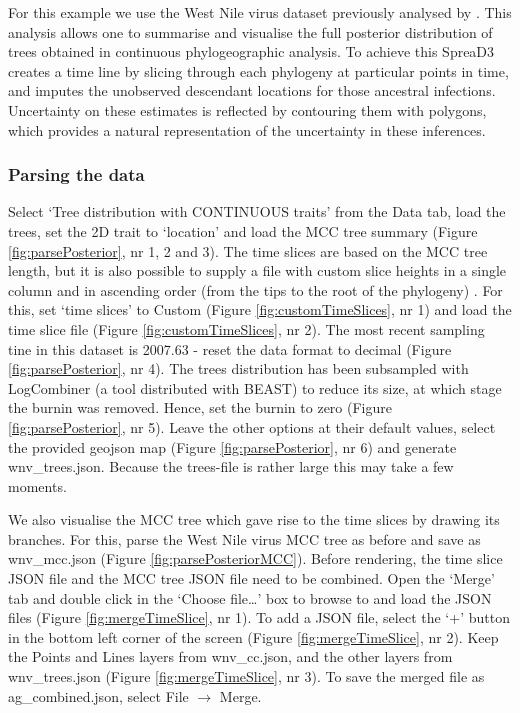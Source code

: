 \documentclass[english]{paper}
\def \spreadname {SpreaD3}
\begin{document}
For this example we use the West Nile virus dataset previously analysed by \citet{Pybus:2012aa}.
This analysis allows one to summarise and visualise the full posterior distribution of trees obtained in continuous phylogeographic analysis. 
To achieve this {\spreadname} creates a time line by slicing through each phylogeny at particular points in time, and imputes the unobserved descendant locations for those ancestral infections.
Uncertainty on these estimates is reflected by contouring them with polygons, which provides a natural representation of the uncertainty in these inferences. 

\subsubsection{Parsing the data}

Select `Tree distribution with CONTINUOUS traits' from the Data tab, load the trees, set the 2D trait to `location' and load the MCC tree summary 
(Figure \ref{fig:parsePosterior}, nr 1, 2 and 3).
The time slices are based on the MCC tree length, but it is also possible to supply a file with custom slice heights in a single column and in ascending order (from the tips to the root of the phylogeny) . 
For this, set `time slices' to Custom (Figure \ref{fig:customTimeSlices}, nr 1) and load the time slice file (Figure \ref{fig:customTimeSlices}, nr 2).
The most recent sampling tine in this dataset is 2007.63 - reset the data format to decimal 
(Figure \ref{fig:parsePosterior}, nr 4).
The trees distribution has been subsampled with LogCombiner (a tool distributed with BEAST) to reduce its size, at which stage the burnin was removed. 
Hence, set the burnin to zero 
(Figure \ref{fig:parsePosterior}, nr 5).
Leave the other options at their default values, select the provided geojson map (Figure \ref{fig:parsePosterior}, nr 6) and generate wnv\_trees.json.
Because the trees-file is rather large this may take a few moments.
\par
We also visualise the MCC tree which gave rise to the time slices by drawing its branches.
For this, parse the West Nile virus MCC tree as before and save as wnv\_mcc.json (Figure \ref{fig:parsePosteriorMCC}).
Before rendering, the time slice JSON file and the MCC tree JSON file need to be combined.
Open the `Merge' tab and double click in the `Choose file\dots' box to browse to and load the JSON files (Figure \ref{fig:mergeTimeSlice}, nr 1).
To add a JSON file, select the `+' button in the bottom left corner of the screen (Figure \ref{fig:mergeTimeSlice}, nr 2).
Keep the Points and Lines layers from wnv\_cc.json, and the other layers from wnv\_trees.json (Figure \ref{fig:mergeTimeSlice}, nr 3).
To save the merged file as ag\_combined.json, select File $\rightarrow$  Merge. 
\end{document}
